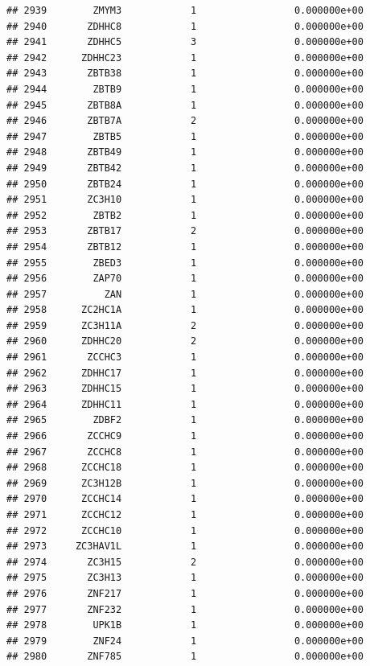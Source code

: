\documentclass[
]{article}
\begin{document}
\begin{verbatim}
## 2939        ZMYM3            1                 0.000000e+00
## 2940       ZDHHC8            1                 0.000000e+00
## 2941       ZDHHC5            3                 0.000000e+00
## 2942      ZDHHC23            1                 0.000000e+00
## 2943       ZBTB38            1                 0.000000e+00
## 2944        ZBTB9            1                 0.000000e+00
## 2945       ZBTB8A            1                 0.000000e+00
## 2946       ZBTB7A            2                 0.000000e+00
## 2947        ZBTB5            1                 0.000000e+00
## 2948       ZBTB49            1                 0.000000e+00
## 2949       ZBTB42            1                 0.000000e+00
## 2950       ZBTB24            1                 0.000000e+00
## 2951       ZC3H10            1                 0.000000e+00
## 2952        ZBTB2            1                 0.000000e+00
## 2953       ZBTB17            2                 0.000000e+00
## 2954       ZBTB12            1                 0.000000e+00
## 2955        ZBED3            1                 0.000000e+00
## 2956        ZAP70            1                 0.000000e+00
## 2957          ZAN            1                 0.000000e+00
## 2958      ZC2HC1A            1                 0.000000e+00
## 2959      ZC3H11A            2                 0.000000e+00
## 2960      ZDHHC20            2                 0.000000e+00
## 2961       ZCCHC3            1                 0.000000e+00
## 2962      ZDHHC17            1                 0.000000e+00
## 2963      ZDHHC15            1                 0.000000e+00
## 2964      ZDHHC11            1                 0.000000e+00
## 2965        ZDBF2            1                 0.000000e+00
## 2966       ZCCHC9            1                 0.000000e+00
## 2967       ZCCHC8            1                 0.000000e+00
## 2968      ZCCHC18            1                 0.000000e+00
## 2969      ZC3H12B            1                 0.000000e+00
## 2970      ZCCHC14            1                 0.000000e+00
## 2971      ZCCHC12            1                 0.000000e+00
## 2972      ZCCHC10            1                 0.000000e+00
## 2973     ZC3HAV1L            1                 0.000000e+00
## 2974       ZC3H15            2                 0.000000e+00
## 2975       ZC3H13            1                 0.000000e+00
## 2976       ZNF217            1                 0.000000e+00
## 2977       ZNF232            1                 0.000000e+00
## 2978        UPK1B            1                 0.000000e+00
## 2979        ZNF24            1                 0.000000e+00
## 2980       ZNF785            1                 0.000000e+00

\end{verbatim}
\end{document}

